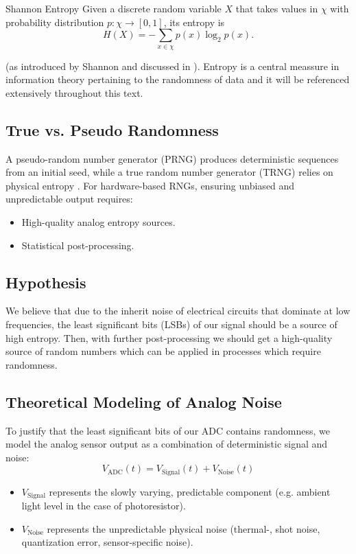 \begin{defn}{Shannon Entropy}{}
Given a discrete random variable $X$ that takes values in $\chi$ with 
probability distribution $p:\chi \to [0,1]$, its entropy is
$$
    H(X) = - \sum_{x \in \chi} p(x) \log_2 p(x).
$$
\end{defn}
(as introduced by Shannon \cite{Shannon1948} 
and discussed in \cite{Gray1990,StatisticShowTo}).
Entropy is a central meassure in information theory pertaining 
to the randomness of data and it will be referenced extensively 
throughout this text.

\subsection{True vs. Pseudo Randomness}
A pseudo-random number generator (PRNG) produces deterministic 
sequences 
from an initial seed, while a true random number generator (TRNG) 
relies 
on physical entropy \cite{HardwareRNGOverview}. 
For hardware-based RNGs, ensuring unbiased and unpredictable output 
requires:
\begin{itemize}
    \item High-quality analog entropy sources.
    \item Statistical post-processing.
\end{itemize}

\subsection{Hypothesis}
We believe that due to the inherit noise of electrical circuits 
that dominate at low frequencies, the 
least significant bits (LSBs) of our signal should be a source of 
high entropy. Then, with further post-processing we should 
get a high-quality source of random numbers which can be applied 
in processes which require randomness.

\newpage
\subsection{Theoretical Modeling of Analog Noise} 
To justify that the least significant bits of our ADC contains 
randomness, we model the analog sensor output as a combination of 
deterministic signal and noise: 
\[ 
    V_{\text{ADC}}(t) = V_{\text{Signal}}(t) + V_{\text{Noise}}(t)
\]

\begin{itemize}
    \item \(V_{\text{Signal}}\) represents the slowly varying, 
        predictable component (e.g. ambient light level in the case 
        of photoresistor). 
    \item \(V_{\text{Noise}}\) represents the unpredictable physical 
        noise (thermal-, shot noise, quantization error, 
        sensor-specific noise).
\end{itemize}

